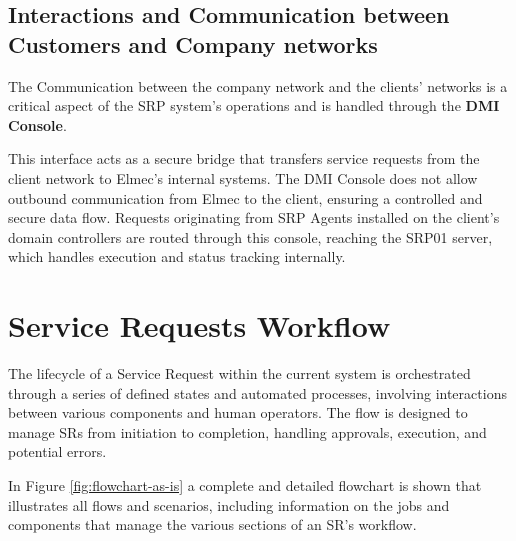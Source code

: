 \subsection{Interactions and Communication between Customers and Company networks}
The Communication between the company network and the clients' networks is a critical aspect of the SRP system's operations and is handled through the \textbf{DMI Console}.

This interface acts as a secure bridge that transfers service requests from the client network to Elmec’s internal systems. The DMI Console does not allow outbound communication from Elmec to the client, ensuring a controlled and secure data flow. Requests originating from SRP Agents installed on the client's domain controllers are routed through this console, reaching the SRP01 server, which handles execution and status tracking internally.

\section{Service Requests Workflow}

The lifecycle of a Service Request within the current system is orchestrated through a series of defined states and automated processes, involving interactions between various components and human operators. The flow is designed to manage SRs from initiation to completion, handling approvals, execution, and potential errors.

In Figure \ref{fig:flowchart-as-is} a complete and detailed flowchart is shown that illustrates all flows and scenarios, including information on the jobs and components that manage the various sections of an SR's workflow.

